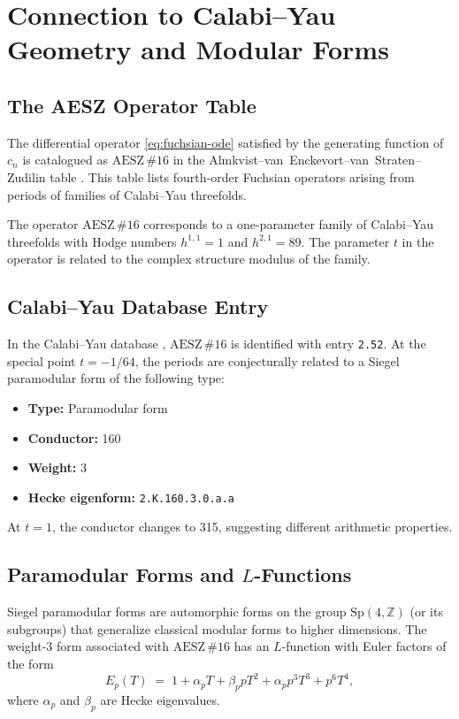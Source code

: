 \documentclass[12pt,a4paper]{article}
\numberwithin{equation}{section}
\theoremstyle{plain}
\theoremstyle{definition}
\theoremstyle{remark}
\newcommand{\Z}{\mathbb{Z}}
\newcommand{\aesz}[1]{\mathrm{AESZ}\,\#\!{#1}}
\begin{document}
\section{Connection to Calabi--Yau Geometry and Modular Forms}\label{sec:modular}

\subsection{The AESZ Operator Table}

The differential operator \eqref{eq:fuchsian-ode} satisfied by the generating function of $c_n$
is catalogued as $\aesz{16}$ in the Almkvist--van~Enckevort--van~Straten--Zudilin table \cite{AESZ2005,AESZ2011}.
This table lists fourth-order Fuchsian operators arising from periods of families of Calabi--Yau threefolds.

The operator $\aesz{16}$ corresponds to a one-parameter family of Calabi--Yau threefolds with Hodge numbers
$h^{1,1} = 1$ and $h^{2,1} = 89$. The parameter $t$ in the operator is related to the complex structure
modulus of the family.

\subsection{Calabi--Yau Database Entry}

In the Calabi--Yau database \cite{CYDB}, $\aesz{16}$ is identified with entry \texttt{2.52}.
At the special point $t = -1/64$, the periods are conjecturally related to a Siegel paramodular form
of the following type:
\begin{itemize}[leftmargin=*,itemsep=2pt]
  \item \textbf{Type:} Paramodular form
  \item \textbf{Conductor:} 160
  \item \textbf{Weight:} 3
  \item \textbf{Hecke eigenform:} \texttt{2.K.160.3.0.a.a}
\end{itemize}

At $t = 1$, the conductor changes to 315, suggesting different arithmetic properties.

\subsection{Paramodular Forms and $L$-Functions}

Siegel paramodular forms are automorphic forms on the group $\mathrm{Sp}(4, \Z)$ (or its subgroups)
that generalize classical modular forms to higher dimensions. The weight-3 form associated with $\aesz{16}$
has an $L$-function with Euler factors of the form
\begin{equation}\label{eq:euler-factor}
  E_p(T) \;=\; 1 + \alpha_p T + \beta_p p T^2 + \alpha_p p^3 T^3 + p^6 T^4,
\end{equation}
where $\alpha_p$ and $\beta_p$ are Hecke eigenvalues.
\end{document}
